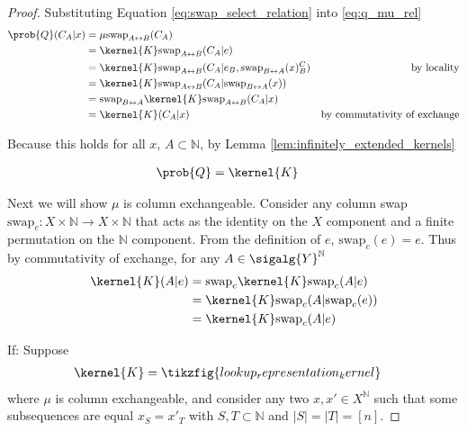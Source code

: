 \begin{proof}
Substituting Equation \ref{eq:swap_select_relation} into \ref{eq:q_mu_rel}
\begin{align}
    \prob{Q}(C_A|x) &= \mu \text{swap}_{A\leftrightarrow B} (C_A)\\
    &= \kernel{K} \text{swap}_{A\leftrightarrow B} (C_A|e)\\
    &= \kernel{K}\text{swap}_{A\leftrightarrow B} (C_A|e_B,\text{swap}_{B\leftrightarrow A}(x)_B^C)&\text{by locality}\\
    &= \kernel{K}\text{swap}_{A\leftrightarrow B} (C_A|\text{swap}_{B\leftrightarrow A}(x))\\
    &= \text{swap}_{B\leftrightarrow A} \kernel{K}\text{swap}_{A\leftrightarrow B} (C_A|x)\\
    &= \kernel{K}(C_A|x)&\text{by commutativity of exchange}
\end{align}

Because this holds for all $x$, $A\subset\mathbb{N}$, by Lemma \ref{lem:infinitely_extended_kernels}

\begin{align}
    \prob{Q} &= \kernel{K}
\end{align}

Next we will show $\mu$ is column exchangeable. Consider any column swap $\text{swap}_{c}:X\times \mathbb{N}\to X\times \mathbb{N}$ that acts as the identity on the $X$ component and a finite permutation on the $\mathbb{N}$ component. From the definition of $e$, $\text{swap}_c(e)=e$. Thus by commutativity of exchange, for any $A\in \sigalg{Y}^{\mathbb{N}}$
\begin{align}
 \kernel{K}(A|e) &= \text{swap}_c\kernel{K}\text{swap}_c(A|e)\\
 &= \kernel{K}\text{swap}_c(A|\text{swap}_c(e))\\
 &= \kernel{K}\text{swap}_c(A|e)
\end{align}


If:
Suppose 
\begin{align}
    \kernel{K} &= \tikzfig{lookup_representation_kernel}
\end{align}
where $\mu$ is column exchangeable, and consider any two $x,x'\in X^{\mathbb{N}}$ such that some subsequences are equal $x_S=x'_T$ with $S,T\subset \mathbb{N}$ and $|S|=|T|=[n]$.


\end{proof}
